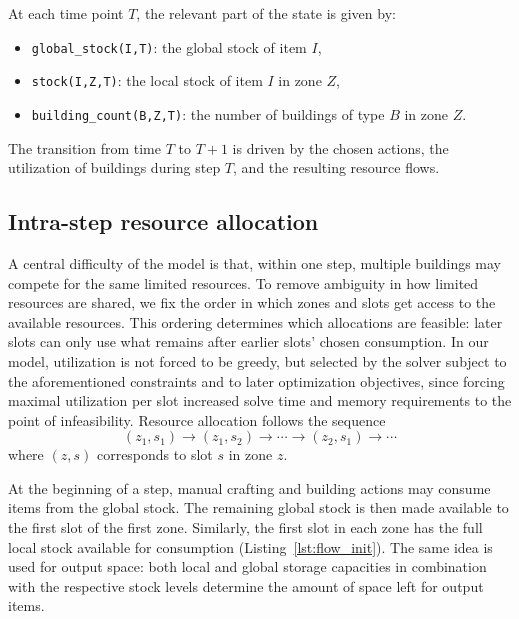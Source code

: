 \documentclass{article}
\begin{document}
At each time point $T$, the relevant part of the state is given by:
\begin{itemize}
    \item \texttt{global\_stock(I,T)}: the global stock of item $I$,
    \item \texttt{stock(I,Z,T)}: the local stock of item $I$ in zone $Z$,
    \item \texttt{building\_count(B,Z,T)}: the number of buildings of type $B$ in zone $Z$.
\end{itemize}
The transition from time $T$ to $T+1$ is driven by the chosen actions, the utilization of buildings during step $T$, and the resulting resource flows.

\subsection{Intra-step resource allocation}
A central difficulty of the model is that, within one step, multiple buildings may compete for the same limited resources. To remove ambiguity in how limited resources are shared, we fix the order in which zones and slots get access to the available resources. This ordering determines which allocations are feasible: later slots can only use what remains after earlier slots’ chosen consumption. In our model, utilization is not forced to be greedy, but selected by the solver subject to the aforementioned constraints and to later optimization objectives, since forcing maximal utilization per slot increased solve time and memory requirements to the point of infeasibility. Resource allocation follows the sequence
\[
(z_1,s_1) \rightarrow (z_1,s_2) \rightarrow \cdots \rightarrow (z_2,s_1) \rightarrow \cdots
\]
where $(z,s)$ corresponds to slot $s$ in zone $z$.

At the beginning of a step, manual crafting and building actions may consume items from the global stock. The remaining global stock is then made available to the first slot of the first zone. Similarly, the first slot in each zone has the full local stock available for consumption (Listing~\ref{lst:flow_init}). The same idea is used for output space: both local and global storage capacities in combination with the respective stock levels determine the amount of space left for output items.
\end{document}
